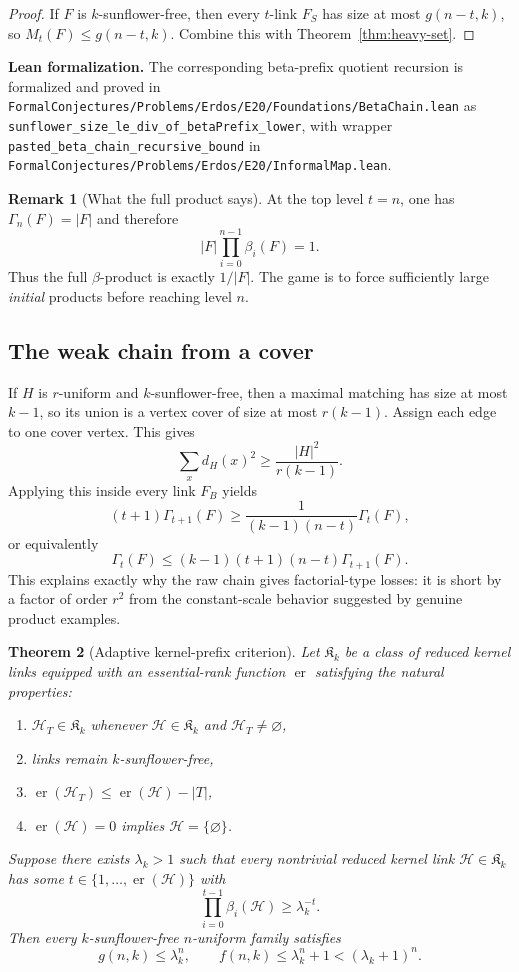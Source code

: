 \documentclass[11pt]{article}
\newtheorem{theorem}{Theorem}[section]
\theoremstyle{definition}
\newtheorem{remark}[theorem]{Remark}
\newcommand{\Hh}{\mathcal{H}}
\newcommand{\er}{\operatorname{er}}
\newcommand{\1}{\mathbf{1}}
\newcommand{\leannote}[1]{\par\smallskip\noindent\textbf{Lean formalization.} #1\par\smallskip}
\begin{document}
\begin{proof}
If $F$ is $k$-sunflower-free, then every $t$-link $F_S$ has size at most $g(n-t,k)$, so $M_t(F)\le g(n-t,k)$. Combine this with Theorem~\ref{thm:heavy-set}.
\end{proof}

\leannote{The corresponding beta-prefix quotient recursion is formalized and proved in \texttt{FormalConjectures/Problems/Erdos/E20/Foundations/BetaChain.lean} as \texttt{sunflower\_size\_le\_div\_of\_betaPrefix\_lower}, with wrapper \texttt{pasted\_beta\_chain\_recursive\_bound} in \texttt{FormalConjectures/Problems/Erdos/E20/InformalMap.lean}.}

\begin{remark}[What the full product says]
At the top level $t=n$, one has $\Gamma_n(F)=|F|$ and therefore
\[
|F|\prod_{i=0}^{n-1}\beta_i(F)=1.
\]
Thus the full $\beta$-product is exactly $1/|F|$. The game is to force sufficiently large \emph{initial} products before reaching level $n$.
\end{remark}

\subsection*{The weak chain from a cover}
If $H$ is $r$-uniform and $k$-sunflower-free, then a maximal matching has size at most $k-1$, so its union is a vertex cover of size at most $r(k-1)$. Assign each edge to one cover vertex. This gives
\[
\sum_x d_H(x)^2\ge \frac{|H|^2}{r(k-1)}.
\]
Applying this inside every link $F_B$ yields
\[
(t+1)\Gamma_{t+1}(F)\ge \frac{1}{(k-1)(n-t)}\Gamma_t(F),
\]
or equivalently
\[
\Gamma_t(F)\le (k-1)(t+1)(n-t)\Gamma_{t+1}(F).
\]
This explains exactly why the raw chain gives factorial-type losses: it is short by a factor of order $r^2$ from the constant-scale behavior suggested by genuine product examples.

\begin{theorem}[Adaptive kernel-prefix criterion]\label{thm:adaptive-kernel-prefix}
Let $\mathfrak K_k$ be a class of reduced kernel links equipped with an essential-rank function $\er$ satisfying the natural properties:
\begin{enumerate}[label=(\roman*),leftmargin=2.2em]
\item $\Hh_T\in \mathfrak K_k$ whenever $\Hh\in\mathfrak K_k$ and $\Hh_T\neq\varnothing$,
\item links remain $k$-sunflower-free,
\item $\er(\Hh_T)\le \er(\Hh)-|T|$,
\item $\er(\Hh)=0$ implies $\Hh=\{\varnothing\}$.
\end{enumerate}
Suppose there exists $\lambda_k>1$ such that every nontrivial reduced kernel link $\Hh\in\mathfrak K_k$ has some $t\in\{1,\dots,\er(\Hh)\}$ with
\[
\prod_{i=0}^{t-1}\beta_i(\Hh)\ge \lambda_k^{-t}.
\]
Then every $k$-sunflower-free $n$-uniform family satisfies
\[
g(n,k)\le \lambda_k^n,
\qquad
f(n,k)\le \lambda_k^n+1< (\lambda_k+1)^n.
\]
\end{theorem}
\end{document}
